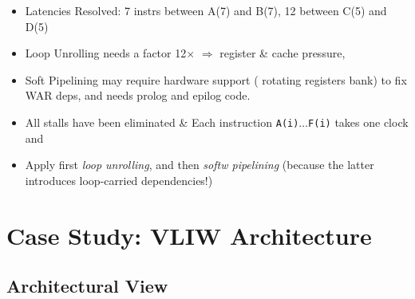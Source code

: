 \documentclass{beamer}
\renewcommand{\emph}[1]{\textcolor{structure}{#1}}
\newcommand{\emp}[1]{\textcolor{DikuRed}{ #1}}
\begin{document}
\begin{frame}[fragile,t]
\begin{scriptsize}
\begin{itemize}
\item \emph{Latencies Resolved: 7 instrs between A(7) and B(7), 12 between C(5) and D(5)} \pause
\item Loop Unrolling needs a factor 12$\times$ $\Rightarrow$ register \& cache pressure,
\item Soft Pipelining may require hardware support (\emp{rotating registers bank}) to fix
        WAR deps, and needs prolog and epilog code.
\item All stalls have been eliminated \& Each instruction {\tt A(i)$\ldots$F(i)} takes one clock and  
\item \emph{Apply first {\em loop unrolling}, and then {\em softw pipelining} 
        (because the latter introduces loop-carried dependencies!)}
\end{itemize}
\end{scriptsize}


\end{frame}



\section{Case Study: VLIW Architecture}

\begin{frame}[fragile]
	\tableofcontents[currentsection]
\end{frame}

\subsection{Architectural View}
\end{document}
